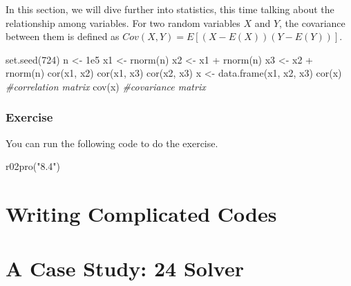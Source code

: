 \documentclass[
]{book}
\newenvironment{Shaded}{\begin{snugshade}}{\end{snugshade}}
\newcommand{\CommentTok}[1]{\textcolor[rgb]{0.56,0.35,0.01}{\textit{#1}}}
\newcommand{\DecValTok}[1]{\textcolor[rgb]{0.00,0.00,0.81}{#1}}
\newcommand{\FloatTok}[1]{\textcolor[rgb]{0.00,0.00,0.81}{#1}}
\newcommand{\FunctionTok}[1]{\textcolor[rgb]{0.00,0.00,0.00}{#1}}
\newcommand{\NormalTok}[1]{#1}
\newcommand{\OtherTok}[1]{\textcolor[rgb]{0.56,0.35,0.01}{#1}}
\newcommand{\SpecialCharTok}[1]{\textcolor[rgb]{0.00,0.00,0.00}{#1}}
\newcommand{\StringTok}[1]{\textcolor[rgb]{0.31,0.60,0.02}{#1}}
\begin{document}
In this section, we will dive further into statistics, this time talking about the relationship among variables. For two random variables \(X\) and \(Y\), the covariance between them is defined as \(Cov(X, Y) = E[(X-E(X))(Y-E(Y))]\).

\begin{Shaded}
\begin{Highlighting}[]
\FunctionTok{set.seed}\NormalTok{(}\DecValTok{724}\NormalTok{)}
\NormalTok{n }\OtherTok{\textless{}{-}} \FloatTok{1e5}
\NormalTok{x1 }\OtherTok{\textless{}{-}} \FunctionTok{rnorm}\NormalTok{(n)}
\NormalTok{x2 }\OtherTok{\textless{}{-}}\NormalTok{ x1 }\SpecialCharTok{+} \FunctionTok{rnorm}\NormalTok{(n)}
\NormalTok{x3 }\OtherTok{\textless{}{-}}\NormalTok{ x2 }\SpecialCharTok{+} \FunctionTok{rnorm}\NormalTok{(n)}
\FunctionTok{cor}\NormalTok{(x1, x2)}
\FunctionTok{cor}\NormalTok{(x1, x3)}
\FunctionTok{cor}\NormalTok{(x2, x3)}
\NormalTok{x }\OtherTok{\textless{}{-}} \FunctionTok{data.frame}\NormalTok{(x1, x2, x3)}
\FunctionTok{cor}\NormalTok{(x) }\CommentTok{\#correlation matrix}
\FunctionTok{cov}\NormalTok{(x) }\CommentTok{\#covariance matrix}
\end{Highlighting}
\end{Shaded}

\hypertarget{exercise-16}{%
\subsection{Exercise}\label{exercise-16}}

You can run the following code to do the exercise.

\begin{Shaded}
\begin{Highlighting}[]
\FunctionTok{r02pro}\NormalTok{(}\StringTok{"8.4"}\NormalTok{)}
\end{Highlighting}
\end{Shaded}

\hypertarget{write-code}{%
\chapter{Writing Complicated Codes}\label{write-code}}

\hypertarget{case-study}{%
\chapter{A Case Study: 24 Solver}\label{case-study}}

  
\end{document}

